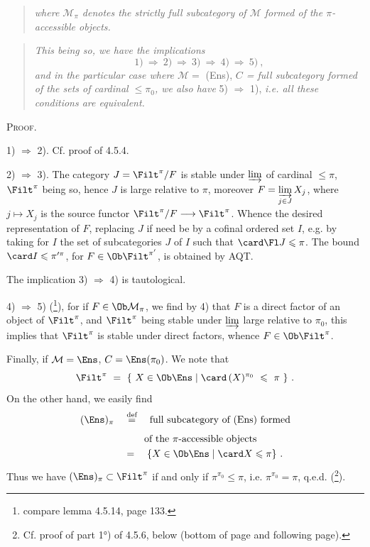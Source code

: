 \setcounter{footnote}{39}



\begin{quote}
\textit{where $\mathcal{M}_\pi$ denotes the strictly full subcategory of $\mathcal{M}$ formed of the $\pi$-accessible objects.}
\end{quote}

\begin{quote}
\textit{This being so, we have the implications}
\[
\mathrm{1)} \ \Longrightarrow\ \mathrm{2)} \ \Longrightarrow\ \mathrm{3)} \ \Longrightarrow\ \mathrm{4)} \ \Longrightarrow\ \mathrm{5)} \ ,
\]
\textit{and in the particular case where $\mathcal{M} = $} (Ens), \textit{$C$ = full subcategory formed of the sets of cardinal $\leqslant \pi_0$, we also have} 5) $\Longrightarrow$ 1), \textit{i.e. all these conditions are equivalent.}
\end{quote}

\textsc{Proof.}

1) $\Longrightarrow$ 2). Cf. proof of 4.5.4.

2) $\Longrightarrow$ 3). The category $J = \Filt^\pi/F$ is stable under $\varinjlim$ of cardinal $\leqslant \pi$, $\Filt^\pi$ being so, hence $J$ is large relative to $\pi$, moreover $F = \varinjlim\limits_{j\in J} X_j$, where $j \longmapsto X_j$ is the source functor $\Filt^\pi/F \longrightarrow \Filt^\pi$. Whence the desired representation of $F$, replacing $J$ if need be by a cofinal ordered set $I$, e.g. by taking for $I$ the set of subcategories $J$ of $I$ such that $\card \Fl J \leqslant \pi$. The bound $\card I \leqslant \pi'^{\pi}$, for $F \in \Ob \Filt^{\pi'}$, is obtained by AQT.

The implication 3) $\Longrightarrow$ 4) is tautological.

4) $\Longrightarrow$ 5) (\footnote{compare lemma 4.5.14, page 133.}), for if $F \in \Ob \mathcal{M}_\pi$, we find by 4) that $F$ is a direct factor of an object of $\Filt^\pi$, and $\Filt^\pi$ being stable under $\varinjlim$
large relative to $\pi_0$, this implies that $\Filt^\pi$ is stable under direct factors, whence $F \in \Ob \Filt^\pi$.

Finally, if $\mathcal{M} = \Ens$, $C = \Ens(\pi_0)$. We note that
\[
\Filt^\pi \ = \ \{ \ X \in \Ob \Ens \mid \card\,(X)^{\pi_0} \ \leqslant \ \pi \ \} \ .
\]
On the other hand, we easily find
\[
\begin{aligned}
(\Ens)_\pi \quad &\overset{\text{def}}{=} \quad \text{full subcategory of (Ens) formed} \\
&\phantom{\overset{\text{def}}{=}} \quad \text{of the $\pi$-accessible objects} \\
&= \quad \{ X \in \Ob \Ens \mid \card X \leqslant \pi \} \ .
\end{aligned}
\]
Thus we have $(\Ens)_\pi \subset \Filt^\pi$ if and only if $\pi^{\pi_0} \leqslant \pi$, i.e. $\pi^{\pi_0} = \pi$, q.e.d. (\footnote{Cf. proof of part 1°) of 4.5.6, below (bottom of page and following page).}).

